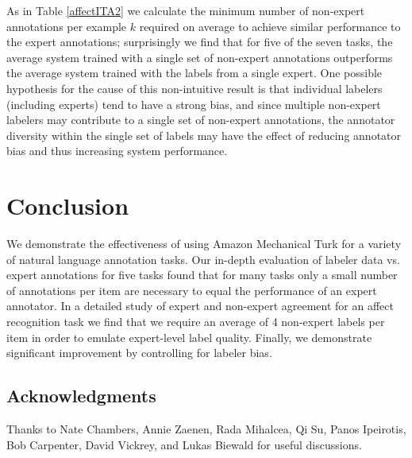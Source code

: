 \documentclass[11pt]{article}
\begin{document}
As in Table \ref{affectITA2} we calculate the minimum number of
non-expert annotations per example $k$ required on average to achieve
similar performance to the expert annotations; surprisingly we find
that for five of the seven tasks, the average system trained with
a single set of non-expert annotations outperforms the average
system trained with the labels from a single expert.  One possible
hypothesis for the cause of this non-intuitive result is that
individual labelers (including experts) tend to have a strong bias,
and since multiple non-expert labelers may contribute to a single
set of non-expert annotations, the annotator diversity within the
single set of labels may have the effect of reducing annotator bias
and thus increasing system performance.
\vspace*{-0.1in}
\section{Conclusion}

We demonstrate the effectiveness of using Amazon Mechanical Turk
for a variety of natural language annotation tasks.  Our
in-depth evaluation of labeler data vs. expert annotations for five
tasks found that for many tasks only a small number of 
annotations per item are necessary to equal the performance of an expert annotator.  
In a detailed study of expert
and non-expert agreement for an affect recognition task we find
that we require an average of 4 non-expert labels per item in order
to emulate expert-level label quality. Finally, we demonstrate significant improvement by controlling for labeler bias.

\subsection*{Acknowledgments}
Thanks to Nate Chambers, Annie Zaenen, Rada Mihalcea, Qi Su, Panos Ipeirotis, Bob Carpenter, David Vickrey, and Lukas Biewald for useful discussions.
\end{document}
